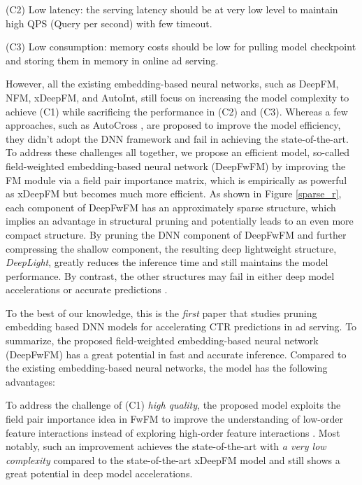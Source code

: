 \documentclass[sigconf]{acmart}
\begin{document}
(C2) Low latency: the serving latency should be at very low level to maintain high QPS (Query per second) with few timeout.

(C3) Low consumption: memory costs should be low for pulling model checkpoint and storing them in memory in online ad serving. 

However, all the existing embedding-based neural networks, such as DeepFM, NFM, xDeepFM, and AutoInt, still focus on increasing the model complexity to achieve (C1) while sacrificing the performance in (C2) and (C3).  Whereas a few approaches, such as AutoCross \citep{autocross}, are proposed to improve the model efficiency, they didn't adopt the DNN framework and fail in achieving the state-of-the-art. To address these challenges all together, we propose an efficient model, so-called field-weighted embedding-based neural network (DeepFwFM) by improving the FM module via a field pair importance matrix, which is empirically as powerful as xDeepFM but becomes much more efficient. As shown in Figure \ref{sparse_r}, each component of DeepFwFM has an approximately sparse structure, which implies an advantage in structural pruning and potentially leads to an even more compact structure. By pruning the DNN component of DeepFwFM and further compressing the shallow component, the resulting deep lightweight structure, \emph{DeepLight}, greatly reduces the inference time and still maintains the model performance. By contrast, the other
structures may fail in either deep model accelerations \citep{NFM, deepcross, xdeepfm, autofis} or accurate predictions \citep{deepfm, deepwide, autoint}. 


To the best of our knowledge, this is the \emph{first} paper that studies pruning embedding based DNN models for accelerating CTR predictions in ad serving. To summarize, the proposed field-weighted embedding-based neural network (DeepFwFM) has a great potential in fast and accurate inference. Compared to the existing embedding-based neural networks, the model has the following advantages:

 To address the challenge of (C1) \emph{high quality}, the proposed model exploits the field pair importance idea in FwFM \citep{fwfm,mt-fwfm} to improve the understanding of low-order feature interactions instead of exploring high-order feature interactions \citep{deepcross, xdeepfm}. Most notably, such an improvement achieves the state-of-the-art with \emph{a very low complexity} compared to the state-of-the-art xDeepFM model and still shows a great potential in deep model accelerations.
\end{document}
